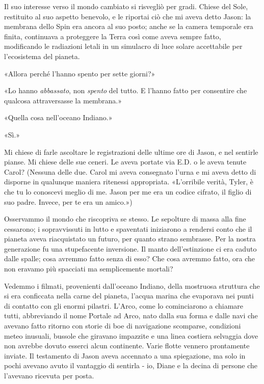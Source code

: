 Il suo interesse verso il mondo cambiato si risvegliò per gradi. Chiese
del Sole, restituito al suo aspetto benevolo, e le riportai ciò che mi
aveva detto Jason: la membrana dello Spin era ancora al suo posto; anche
se la camera temporale era finita, continuava a proteggere la Terra così
come aveva sempre fatto, modificando le radiazioni letali in un
simulacro di luce solare accettabile per l'ecosistema del pianeta.

«Allora perché l'hanno spento per sette giorni?»

«Lo hanno \emph{abbassato}, non \emph{spento} del tutto. E l'hanno fatto
per consentire che qualcosa attraversasse la membrana.»

«Quella cosa nell'oceano Indiano.»

«Sì.»

Mi chiese di farle ascoltare le registrazioni delle ultime ore di Jason,
e nel sentirle pianse. Mi chiese delle sue ceneri. Le aveva portate via
E.D. o le aveva tenute Carol? (Nessuna delle due. Carol mi aveva
consegnato l'urna e mi aveva detto di disporne in qualunque maniera
ritenessi appropriata. «L'orribile verità, Tyler, è che tu lo conoscevi
meglio di me. Jason per me era un codice cifrato, il figlio di suo
padre. Invece, per te era un amico.»)

Osservammo il mondo che riscopriva se stesso. Le sepolture di massa alla
fine cessarono; i sopravvissuti in lutto e spaventati iniziarono a
rendersi conto che il pianeta aveva riacquistato un futuro, per quanto
strano sembrasse. Per la nostra generazione fu una stupefacente
inversione. Il manto dell'estinzione ci era caduto dalle spalle; cosa
avremmo fatto senza di esso? Che cosa avremmo fatto, ora che non eravamo
più spacciati ma semplicemente mortali?

Vedemmo i filmati, provenienti dall'oceano Indiano, della mostruosa
struttura che si era conficcata nella carne del pianeta, l'acqua marina
che evaporava nei punti di contatto con gli enormi pilastri. L'Arco,
come lo cominciarono a chiamare tutti, abbreviando il nome Portale ad
Arco, nato dalla sua forma e dalle navi che avevano fatto ritorno con
storie di boe di navigazione scomparse, condizioni meteo inusuali,
bussole che giravano impazzite e una linea costiera selvaggia dove non
avrebbe dovuto esserci alcun continente. Varie flotte vennero
prontamente inviate. Il testamento di Jason aveva accennato a una
spiegazione, ma solo in pochi avevano avuto il vantaggio di sentirla -
io, Diane e la decina di persone che l'avevano ricevuta per posta.

